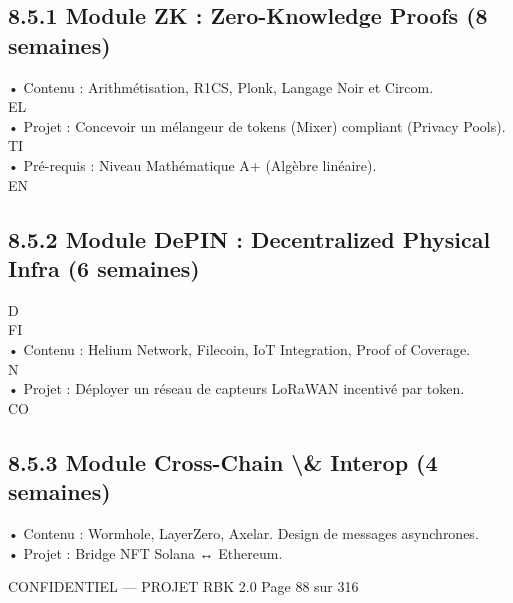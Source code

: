 \documentclass[12pt,landscape,a4paper]{article}
\newenvironment{confidential}
{\begin{tcolorbox}[
    colback=rbkred!5!white,
    colframe=rbkred!75!black,
    title=CONFIDENTIEL,
    fonttitle=\bfseries\color{white},
    coltitle=rbkred!75!black,
    breakable,
    enhanced,
    frame hidden,
    borderline west={2pt}{0pt}{rbkred!75!black}
]}
{\end{tcolorbox}}
\begin{document}
\subsection{8.5.1 Module ZK : Zero-Knowledge Proofs (8 semaines)}
• Contenu : Arithmétisation, R1CS, Plonk, Langage Noir et Circom.\\
\vspace{0.5em}
\vspace{0.5em}
\vspace{0.5em}
\vspace{0.5em}
EL\\
• Projet : Concevoir un mélangeur de tokens (Mixer) compliant (Privacy Pools).\\
\vspace{0.5em}
\vspace{0.5em}
\vspace{0.5em}
\vspace{0.5em}
TI\\
• Pré-requis : Niveau Mathématique A+ (Algèbre linéaire).\\
\vspace{0.5em}
\vspace{0.5em}
\vspace{0.5em}
\vspace{0.5em}
EN\\
\subsection{8.5.2 Module DePIN : Decentralized Physical Infra (6 semaines)}
\vspace{0.5em}
\vspace{0.5em}
\vspace{0.5em}
\vspace{0.5em}
D\\
FI\\
• Contenu : Helium Network, Filecoin, IoT Integration, Proof of Coverage.\\
\vspace{0.5em}
\vspace{0.5em}
N\\
• Projet : Déployer un réseau de capteurs LoRaWAN incentivé par token.\\
CO\\
\subsection{8.5.3 Module Cross-Chain \textbackslash{}& Interop (4 semaines)}
• Contenu : Wormhole, LayerZero, Axelar. Design de messages asynchrones.\\
\vspace{0.5em}
• Projet : Bridge NFT Solana ↔ Ethereum.\\
\vspace{0.5em}
\vspace{0.5em}
\vspace{0.5em}
\vspace{0.5em}
\begin{confidential}CONFIDENTIEL — PROJET RBK 2.0                               Page 88 sur 316\end{confidential}
\end{document}
